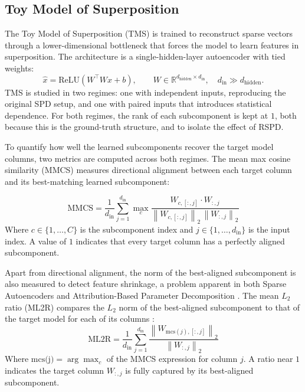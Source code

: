 \documentclass{article}
\begin{document}
\subsection{Toy Model of Superposition}
\label{sec:tms-experiments}

The Toy Model of Superposition (TMS) \autocite{elhage2022toymodelssuperposition} is trained to reconstruct sparse vectors through a lower-dimensional bottleneck that forces the model to learn features in superposition. The architecture is a single-hidden-layer autoencoder with tied weights:
\begin{equation}
    \hat{x} = \mathrm{ReLU}(W^{\top}Wx + b), \qquad W \in \mathbb{R}^{d_{\text{hidden}} \times d_{\text{in}}}, \quad d_{\text{in}} \gg d_{\text{hidden}}.
\end{equation}
TMS is studied in two regimes: one with independent inputs,
reproducing the original SPD setup, and one with paired
inputs that introduces statistical dependence. For both regimes,
the rank of each subcomponent is kept at $1$,
 both because this is the ground-truth structure, and to isolate the effect of RSPD.

To quantify how well the learned subcomponents recover the target model columns,
two metrics are computed across both regimes.
The mean max cosine similarity (MMCS) \autocite{cunningham2023takingfeatures}
measures directional alignment between each target column and its
best-matching learned subcomponent:

\begin{equation}
\text{MMCS}
=
\frac{1}{d_{\text{in}}}
\sum_{j=1}^{d_{\text{in}}}
\max_{c}
\frac{
W_{c,[:,j]} \cdot W_{:,j}
}{
\left\| W_{c,[:,j]} \right\|_2 \, \left\| W_{:,j} \right\|_2
}
\end{equation}
Where $c  \in \{1,\dots, C\}$ is the subcomponent index and
$j \in \{1, \ldots, d_{\text{in}}\}$ is the input index. A value of $1$ indicates
that every target column has a perfectly aligned subcomponent.

Apart from directional alignment, the norm of the best-aligned subcomponent
is also measured to detect feature shrinkage, a problem apparent
in both Sparse Autoencoders and Attribution-Based Parameter
Decomposition \autocite{jermyn2024tanhPenaltyDictionaryLearning,wright2024featureSuppressionSAEs,AttributionBasedParameterDecomposition}.
The mean $L_{2}$ ratio (ML2R) compares the $L_{2}$ norm of the best-aligned
subcomponent to that of the target model for each of its columns \autocite{stochasticparameterdecomposition}:
\begin{equation}
    \text{ML2R}
=
\frac{1}{d_{\text{in}}}
\sum_{j=1}^{d_{\text{in}}}
\frac{
\left\| W_{\mathrm{mcs}(j),[:,j]} \right\|_2
}{
\left\| W_{:,j} \right\|_2
}
\end{equation}
Where $\text{mcs(j)} = \arg \max_{c}$ of the MMCS expression for column $j$.
A ratio near $1$ indicates the target column $W_{:,j}$ is fully
captured by its best-aligned subcomponent.
\end{document}
